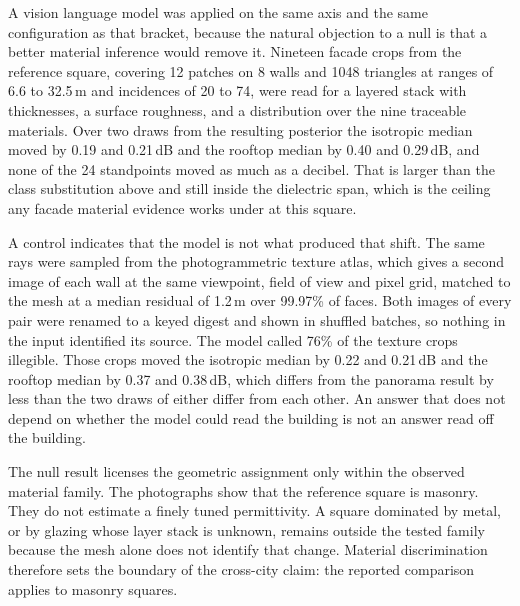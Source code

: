 \documentclass[journal]{IEEEtran}
\begin{document}
A vision language model was applied on the same axis and the same configuration
as that bracket, because the natural objection to a null is that a better
material inference would remove it. Nineteen facade crops from the reference
square, covering 12 patches on 8 walls and 1048 triangles at ranges of 6.6 to
32.5\,m and incidences of 20 to 74\textdegree{}, were read for a layered stack
with thicknesses, a surface roughness, and a distribution over the nine
traceable materials. Over two draws from the resulting posterior the isotropic
median moved by 0.19 and 0.21\,dB and the rooftop median by 0.40 and 0.29\,dB,
and none of the 24 standpoints moved as much as a decibel. That is larger than
the class substitution above and still inside the dielectric span, which is the
ceiling any facade material evidence works under at this square.

A control indicates that the model is not what produced that shift. The same
rays were sampled from the photogrammetric texture atlas, which gives a second
image of each wall at the same viewpoint, field of view and pixel grid, matched
to the mesh at a median residual of 1.2\,\textmu m over 99.97\% of faces. Both
images of every pair were renamed to a keyed digest and shown in shuffled
batches, so nothing in the input identified its source. The model called 76\% of
the texture crops illegible. Those crops moved the isotropic median by 0.22 and
0.21\,dB and the rooftop median by 0.37 and 0.38\,dB, which differs from the
panorama result by less than the two draws of either differ from each other. An
answer that does not depend on whether the model could read the building is not
an answer read off the building.

The null result licenses the geometric assignment only within the observed
material family. The photographs show that the reference square is masonry.
They do not estimate a finely tuned permittivity. A square dominated by metal,
or by glazing whose layer stack is unknown, remains outside the tested family
because the mesh alone does not identify that change. Material discrimination
therefore sets the boundary of the cross-city claim: the reported comparison
applies to masonry squares.

\end{document}
